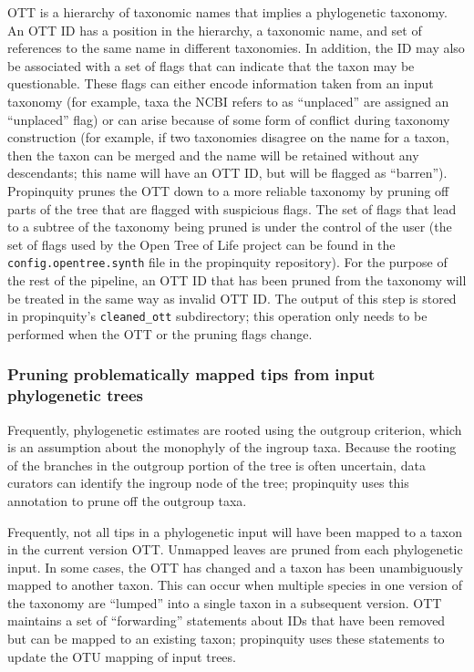 \documentclass[fleqn,12pt,lineno,english]{wlpeerj}
\begin{document}
OTT is a hierarchy of taxonomic names that implies a phylogenetic
taxonomy. An OTT ID has a position in the hierarchy, a taxonomic name,
and set of references to the same name in different taxonomies. In
addition, the ID may also be associated with a set of flags that can
indicate that the taxon may be questionable. These flags can either
encode information taken from an input taxonomy (for example, taxa
the NCBI refers to as ``unplaced'' are assigned an ``unplaced''
flag) or can arise because of some form of conflict during taxonomy
construction (for example, if two taxonomies disagree on the name
for a taxon, then the taxon can be merged and the name will be retained
without any descendants; this name will have an OTT ID, but will be
flagged as ``barren''). Propinquity prunes the OTT down to a more
reliable taxonomy by pruning off parts of the tree that are flagged
with suspicious flags. The set of flags that lead to a subtree of
the taxonomy being pruned is under the control of the user (the set
of flags used by the Open Tree of Life project can be found in the
\texttt{config.opentree.synth} file in the propinquity repository).
For the purpose of the rest of the pipeline, an OTT ID that has been
pruned from the taxonomy will be treated in the same way as invalid
OTT ID. The output of this step is stored in propinquity's \texttt{cleaned\_ott}
subdirectory; this operation only needs to be performed when the OTT
or the pruning flags change.

\subsubsection{Pruning problematically mapped tips from input phylogenetic trees}

Frequently, phylogenetic estimates are rooted using the outgroup criterion,
which is an assumption about the monophyly of the ingroup taxa. Because
the rooting of the branches in the outgroup portion of the tree is
often uncertain, data curators can identify the ingroup node of the
tree; propinquity uses this annotation to prune off the outgroup taxa.

Frequently, not all tips in a phylogenetic input will have been mapped
to a taxon in the current version OTT. Unmapped leaves are pruned
from each phylogenetic input. In some cases, the OTT has changed and
a taxon has been unambiguously mapped to another taxon. This can occur
when multiple species in one version of the taxonomy are ``lumped''
into a single taxon in a subsequent version. OTT maintains a set of
``forwarding'' statements about IDs that have been removed but can
be mapped to an existing taxon; propinquity uses these statements
to update the OTU mapping of input trees.
\end{document}
